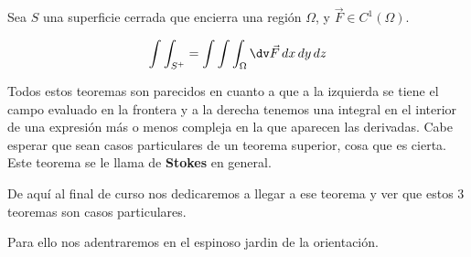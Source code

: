 \begin{theorem}
Sea $S$ una superficie cerrada que encierra una región $\Omega$, y $\vec{F}\in C^1(\Omega)$.

\[ \int\int_{S^+} = \int\int\int_\Omega \dv \vec{F}\, dx\, dy\, dz \]
\end{theorem}


Todos estos teoremas son parecidos en cuanto a que a la izquierda se tiene el campo evaluado en la frontera y a la derecha tenemos una integral en el interior de una expresión más o menos compleja en la que aparecen las derivadas. Cabe esperar que sean casos particulares de un teorema superior, cosa que es cierta. Este teorema se le llama de \textbf{Stokes} en general. 

De aquí al final de curso nos dedicaremos a llegar a ese teorema y ver que estos 3 teoremas son casos particulares. 

Para ello nos adentraremos en el espinoso jardin de la orientación.





